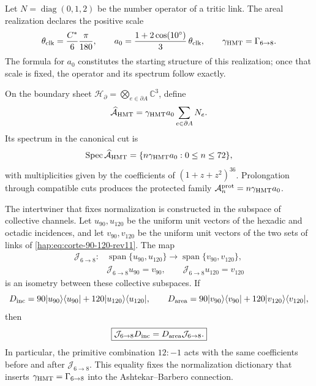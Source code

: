 Let \(N=\operatorname{diag}(0,1,2)\) be the number operator of a tritic link.
The areal realization declares the positive scale
\[
 \theta_{\rm clk}=\frac{C^*}{6}\frac{\pi}{180},
 \qquad
 a_0=\frac{1+2\cos(10^\circ)}{3}\,\theta_{\rm clk},
 \qquad \gamma_{\rm HMT}=\Gamma_{6\to8}.
\]
The formula for \(a_0\) constitutes the starting structure of this
realization; once that scale is fixed, the operator and its spectrum follow
exactly.

\begin{definition}
On the boundary sheet
\(\mathcal H_{\partial}=\bigotimes_{e\in\partial A}\mathbb C^3\), define
\begin{equation}
 \widehat{\mathcal A}_{\rm HMT}
 =\gamma_{\rm HMT}a_0\sum_{e\in\partial A}N_e.
 \label{hap:eq:operador-area-hmt-rev11}
\end{equation}
Its spectrum in the canonical cut is
\[
 \operatorname{Spec}\widehat{\mathcal A}_{\rm HMT}
 =\{n\gamma_{\rm HMT}a_0:0\leq n\leq72\},
\]
with multiplicities given by the coefficients of
\((1+z+z^2)^{36}\). Prolongation through compatible cuts produces the
protected family \(\mathcal A_n^{\rm prot}=n\gamma_{\rm HMT}a_0\).
\end{definition}

The intertwiner that fixes normalization is constructed in the subspace of
collective channels. Let \(u_{90},u_{120}\) be the uniform unit vectors
of the hexadic and octadic incidences, and let \(v_{90},v_{120}\) be the
uniform unit vectors of the two sets of links of
\eqref{hap:eq:corte-90-120-rev11}. The map
\begin{equation}
 \begin{aligned}
 \mathcal J_{6\to8}:{}
 &\operatorname{span}\{u_{90},u_{120}\}
 \longrightarrow
 \operatorname{span}\{v_{90},v_{120}\},\\
 &\mathcal J_{6\to8}u_{90}=v_{90},
 \qquad
 \mathcal J_{6\to8}u_{120}=v_{120}
 \end{aligned}
 \label{hap:eq:entrelazador-area-barbero-rev11}
\end{equation}
is an isometry between these collective subspaces. If
\[
 D_{\rm inc}=90|u_{90}\rangle\langle u_{90}|
 +120|u_{120}\rangle\langle u_{120}|,
 \qquad
 D_{\rm area}=90|v_{90}\rangle\langle v_{90}|
 +120|v_{120}\rangle\langle v_{120}|,
\]
then
\[
 \boxed{\mathcal J_{6\to8}D_{\rm inc}
 =D_{\rm area}\mathcal J_{6\to8}.}
\]
In particular, the primitive combination \(12:-1\) acts
with the same coefficients before and after \(\mathcal J_{6\to8}\). This
equality fixes the normalization dictionary that inserts
\(\gamma_{\rm HMT}=\Gamma_{6\to8}\) into the
Ashtekar--Barbero connection.

